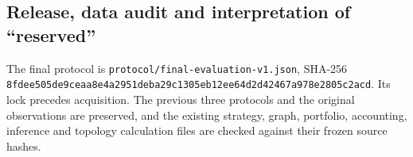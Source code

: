\documentclass[12pt,a4paper,oneside]{article}
\begin{document}
\subsection{Release, data audit and interpretation of “reserved”}

The final protocol is {\fontsize{9.3}{12}\selectfont\nolinkurl{protocol/final-evaluation-v1.json}}, SHA-256 {\fontsize{9.3}{12}\selectfont\nolinkurl{8fdee505de9ceaa8e4a2951deba29c1305eb12ee64d2d42467a978e2805c2acd}}. Its lock precedes acquisition. The previous three protocols and the original observations are preserved, and the existing strategy, graph, portfolio, accounting, inference and topology calculation files are checked against their frozen source hashes.


\begingroup
\setcounter{table}{17}
\fontsize{10}{12.5}\selectfont
\renewcommand{\arraystretch}{1.12}
\end{document}
